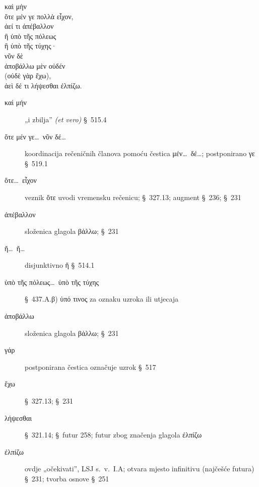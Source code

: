 {\large
\begin{greek}
\noindent καὶ μὴν \\
\tabto{2em} ὅτε μέν γε πολλὰ εἶχον, \\
\tabto{2em} ἀεί τι ἀπέβαλλον \\
\tabto{4em} ἢ ὑπὸ τῆς πόλεως \\
\tabto{4em} ἢ ὑπὸ τῆς τύχης· \\
νῦν δὲ \\
\tabto{2em} ἀποβάλλω μὲν οὐδέν \\
(οὐδὲ γὰρ ἔχω), \\
\tabto{2em} ἀεὶ δέ τι λήψεσθαι ἐλπίζω.\\

\end{greek}
}

\begin{description}
\item[καὶ μήν] „i zbilja” \textit{(et vero)} §~515.4
\item[ὅτε μέν γε\dots\ νῦν δέ\dots] koordinacija rečeničnih članova pomoću čestica μέν\dots\ δέ\dots; postponirano γε §~519.1
\item[ὅτε\dots\ εἶχον] veznik ὅτε uvodi vremensku rečenicu; §~327.13; augment §~236; §~231 
\item[ἀπέβαλλον] složenica glagola βάλλω; §~231
\item[ἤ\dots\ ἤ\dots] disjunktivno ἤ §~514.1
\item[ὑπὸ τῆς πόλεως\dots\ ὑπὸ τῆς τύχης] §~437.A.β) ὑπό τινος za oznaku uzroka ili utjecaja
\item[ἀποβάλλω] složenica glagola βάλλω; §~231
\item[γάρ] postponirana čestica označuje uzrok §~517
\item[ἔχω] §~327.13; §~231
\item[λήψεσθαι] §~321.14; §~futur 258; futur zbog značenja glagola ἐλπίζω
\item[ἐλπίζω] ovdje „očekivati”, LSJ s.~v.\ I.A; otvara mjesto infinitivu (najčešće futura) §~231; tvorba osnove §~251

\end{description}

